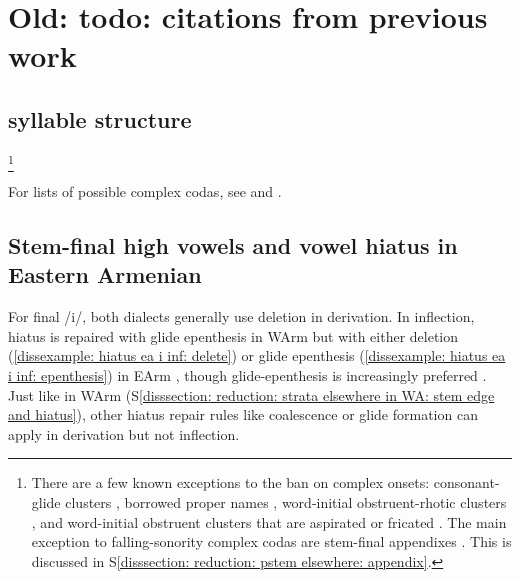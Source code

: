 \section{Old: todo: citations from previous work}


\subsection{syllable structure}
\footnote{There are a few known exceptions to the ban on complex onsets: consonant-glide clusters \citep[81]{Vaux-1998-ArmenianPhono}, borrowed proper names \citep{Baronian-2017-TwoProblemsArmenianPhono}, word-initial obstruent-rhotic clusters \citep{Tokhmɑkʰyan-1988-ConnectingArmenianSounds}, and word-initial obstruent clusters that are aspirated or fricated \citep{Hovakimyan-2016-EasternArmenianClusters}. The main exception to falling-sonority complex codas are stem-final appendixes \citep{VauxWolf-2009-Appendix}. This is discussed in S\ref{disssection: reduction: pstem  elsewhere: appendix}.} 

For lists of possible complex codas, see \citet[20]{Fairbanks-1948-PhonologyMorphoWestern} and \citet[23]{Vaux-1998-ArmenianPhono}. 

\subsection{Stem-final high vowels and vowel hiatus in Eastern Armenian}\label{disssection: reduction: pstem  elsewhere: vowel hiatus EA}


For final /i/,  both dialects generally use deletion in derivation. In   inflection, hiatus is repaired with glide epenthesis in WArm but with either  deletion (\ref{dissexample: hiatus ea i inf: delete}) or glide epenthesis (\ref{dissexample: hiatus ea i inf: epenthesis}) in EArm \cite[100ff]{Margaryan-1997-ArmenianPhonology}, though glide-epenthesis is increasingly preferred  \cite[140,197]{Sargsyan-1987-DoubletsNouns}. Just like in WArm (S\ref{disssection: reduction: strata elsewhere in WA: stem edge and hiatus}),   other hiatus repair rules like coalescence or glide formation can apply in derivation but {not} inflection. 



